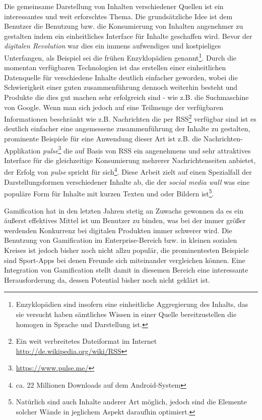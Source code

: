 \documentclass[12pt,twoside]{book}
\begin{document}
Die gemeinsame Darstellung von Inhalten verschiedener Quellen ist ein interessantes und weit erforschtes Thema. Die grundsätzliche Idee ist dem Benutzer die Benutzung bzw. die Konsumierung von Inhalten angenehmer zu gestalten indem ein einheitliches Interface für Inhalte geschaffen wird. Bevor der \textit{digitalen Revolution} war dies ein immens aufwendiges und kostpieliges Unterfangen, als Beispiel sei die frühen Enzyklopädien genannt\footnote{Enzyklopädien sind insofern eine einheitliche Aggregierung des Inhalts, das sie versucht haben sämtliches Wissen in einer Quelle bereitzustellen die homogen in Sprache und Darstellung ist.}. Durch die momentan verfügbaren Technologien ist das erstellen einer einheitlichen Datenquelle für verschiedene Inhalte deutlich einfacher geworden, wobei die Schwierigkeit einer guten zusammenführung dennoch weiterhin besteht und Produkte die dies gut machen sehr erfolgreich sind - wie z.B. die Suchmaschine von Google.
Wenn man sich jedoch auf eine Teilmenge der verfügbaren Informationen beschränkt wie z.B. Nachrichten die per RSS\footnote{Ein weit verbreitetes Dateiformat im Internet \url{http://de.wikipedia.org/wiki/RSS}} verfügbar sind ist es deutlich einfacher eine angemessene zusammenführung der Inhalte zu gestalten, prominente Beispiele für eine Anwendung dieser Art ist z.B. die Nachrichten-Applikation \textit{pulse}\footnote{\url{https://www.pulse.me/}} die auf Basis von RSS ein angenehmens und sehr attraktives Interface für die gleichzeitige Konsumierung mehrerer Nachrichtenseiten anbietet, der Erfolg von \textit{pulse} spricht für sich\footnote{ca. 22 Millionen Downloads auf dem Android-System}. Diese Arbeit zielt auf einen Spezialfall der Darstellungsformen verschiedener Inhalte ab, die der \textit{social media wall} was eine populäre Form für Inhalte mit kurzen Texten und oder Bildern ist\footnote{Natürlich sind auch Inhalte anderer Art möglich, jedoch sind die Elemente solcher Wände in jeglichem Aspekt daraufhin optimiert.}.

Gamification hat in den letzten Jahren stetig an Zuwachs gewonnen da es ein äußerst effektives Mittel ist um Benutzer zu binden, was bei der immer größer werdenden Konkurrenz bei digitalen Produkten immer schwerer wird. Die Benutzung von Gamification im Enterprise-Bereich bzw. in kleinen sozialen Kreises ist jedoch bisher noch nicht allzu populär, die prominentesten Beispiele sind Sport-Apps bei denen Freunde sich miteinander vergleichen können. Eine Integration von Gamification stellt damit in diesemen Bereich eine interessante Herausforderung da, dessen Potential bisher noch nicht geklärt ist.
\end{document}
